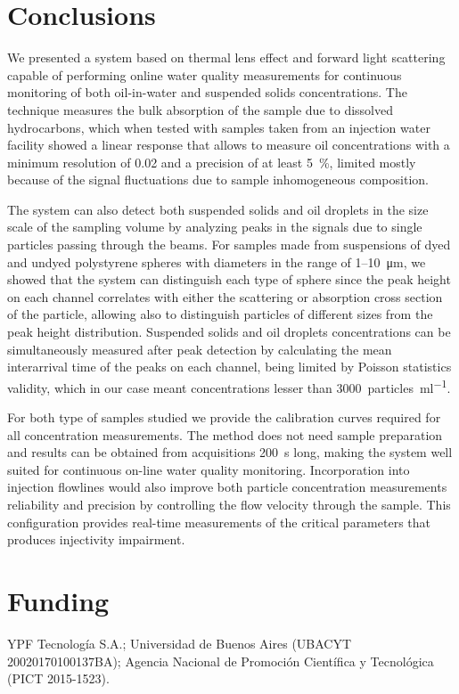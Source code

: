 \documentclass[9pt,twocolumn,twoside]{osajnl}
\begin{document}
\section{Conclusions}
\label{Conclusions}

We presented a system based on thermal lens effect and forward light scattering capable of performing online water quality measurements for continuous monitoring of both oil-in-water and suspended solids concentrations. The technique measures the bulk absorption of the sample due to dissolved hydrocarbons, which when tested with samples taken from an injection water facility showed a linear response that allows to measure oil concentrations with a minimum resolution of \SI{0.02}{\ppm} and a precision of at least \SI{5}{\percent}, limited mostly because of the signal fluctuations due to sample inhomogeneous composition.

The system can also detect both suspended solids and oil droplets in the size scale of the sampling volume by analyzing peaks in the signals due to single particles passing through the beams. For samples made from suspensions of dyed and undyed polystyrene spheres with diameters in the range of \SI{1}{}--\SI{10}{\micro\metre}, we showed that the system can distinguish each type of sphere since the peak height on each channel correlates with either the scattering or absorption cross section of the particle, allowing also to distinguish particles of different sizes from the peak height distribution. Suspended solids and oil droplets concentrations can be simultaneously measured after peak detection by calculating the mean interarrival time of the peaks on each channel, being limited by Poisson statistics validity, which in our case meant concentrations lesser than \SI{3000}{particles\per\milli\litre}.

For both type of samples studied we provide the calibration curves required for all concentration measurements. The method does not need sample preparation and results can be obtained from acquisitions \SI{200}{\second} long, making the system well suited for continuous on-line water quality monitoring. Incorporation into injection flowlines would also improve both particle concentration measurements reliability and precision by controlling the flow velocity through the sample. This configuration provides real-time measurements of the critical parameters that produces injectivity impairment.





\section*{Funding}
YPF Tecnología S.A.; Universidad de Buenos Aires (UBACYT 20020170100137BA); Agencia Nacional de Promoción Científica y Tecnológica (PICT 2015-1523).
\end{document}
